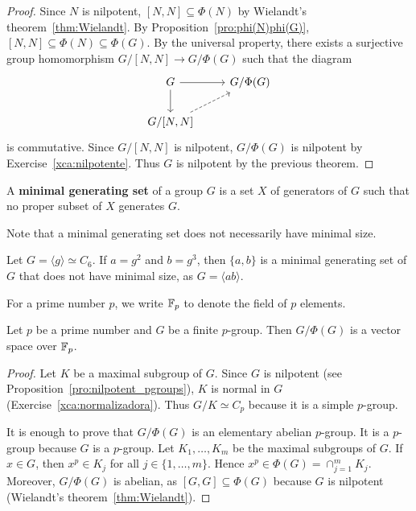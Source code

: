 \begin{proof}
Since $N$ is nilpotent, $[N,N]\subseteq\Phi(N)$ by 
Wielandt's theorem~\ref{thm:Wielandt}. 
By Proposition~\ref{pro:phi(N)phi(G)},
$[N,N]\subseteq\Phi(N)\subseteq\Phi(G)$. 
By the universal property, there exists a surjective group homomorphism 
$G/[N,N]\to G/\Phi(G)$ such that the diagram 
    \[
    \begin{tikzcd}
	G & {G/\Phi(G)} \\
	{G/[N,N]}
	\arrow[from=1-1, to=1-2]
	\arrow[from=1-1, to=2-1]
	\arrow[dashed, from=2-1, to=1-2]
    \end{tikzcd}
    \]
is commutative. Since $G/[N,N]$ is nilpotent, $G/\Phi(G)$ is nilpotent by 
Exercise~\ref{xca:nilpotente}. Thus $G$ is nilpotent by the previous theorem. 
\end{proof}

\begin{definition}
A \textbf{minimal generating set} of a group $G$ is a set 
$X$ of generators of $G$ such that no proper subset of $X$ generates $G$. 
\end{definition}

Note that a minimal generating set does not necessarily have minimal size. 
	
\begin{example}
Let $G=\langle g\rangle\simeq C_6$.  If $a=g^2$ and 
$b=g^3$, then $\{a,b\}$ is a minimal generating set of $G$ that does not have
minimal size, as $G=\langle ab\rangle$.
\end{example}
	
For a prime number $p$, we write $\mathbb{F}_p$ to denote the field of $p$ elements. 

\begin{lemma}
\label{lem:Burnside:minimal}
Let $p$ be a prime number and 
$G$ be a finite $p$-group. Then $G/\Phi(G)$ is a vector space over $\mathbb{F}_p$.
\end{lemma}

\begin{proof}
Let $K$ be a maximal subgroup of $G$. Since $G$ is nilpotent 
(see Proposition~\ref{pro:nilpotent_pgroups}), 
$K$ is normal in $G$ (Exercise~\ref{xca:normalizadora}). 
Thus $G/K\simeq C_p$ because it is a simple $p$-group. 
	
It is enough to prove that $G/\Phi(G)$ is an elementary abelian $p$-group. It is a 
$p$-group because $G$ is a $p$-group. Let $K_1,\dots,K_m$ be the maximal subgroups 
of $G$. If $x\in G$, then $x^p\in K_j$ for all $j\in\{1,\dots,m\}$. Hence 
$x^p\in\Phi(G)=\cap_{j=1}^m K_j$. Moreover,  $G/\Phi(G)$ is abelian, as 
$[G,G]\subseteq \Phi(G)$ because $G$ is nilpotent (Wielandt's theorem~\ref{thm:Wielandt}). 
\end{proof}

